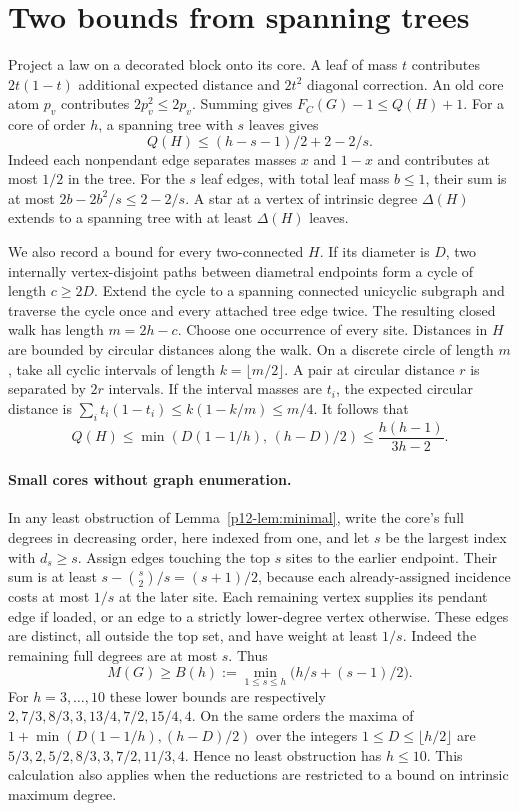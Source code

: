 \documentclass[11pt,a4paper]{article}
\begin{document}
\section{Two bounds from spanning trees}
Project a law on a decorated block onto its core. A leaf of mass $t$ contributes $2t(1-t)$ additional expected distance and $2t^2$ diagonal correction. An old core atom $p_v$ contributes $2p_v^2\le2p_v$. Summing gives $F_C(G)-1\le Q(H)+1$. For a core of order $h$, a spanning tree with $s$ leaves gives
\[
 Q(H)\le (h-s-1)/2+2-2/s.
\]
Indeed each nonpendant edge separates masses $x$ and $1-x$ and contributes at most $1/2$ in the tree. For the $s$ leaf edges, with total leaf mass $b\le1$, their sum is at most $2b-2b^2/s\le2-2/s$. A star at a vertex of intrinsic degree $\Delta(H)$ extends to a spanning tree with at least $\Delta(H)$ leaves.

We also record a bound for every two-connected $H$. If its diameter is $D$, two internally vertex-disjoint paths between diametral endpoints form a cycle of length $c\ge2D$. Extend the cycle to a spanning connected unicyclic subgraph and traverse the cycle once and every attached tree edge twice. The resulting closed walk has length $m=2h-c$. Choose one occurrence of every site. Distances in $H$ are bounded by circular distances along the walk. On a discrete circle of length $m$, take all cyclic intervals of length $k=\lfloor m/2\rfloor$. A pair at circular distance $r$ is separated by $2r$ intervals. If the interval masses are $t_i$, the expected circular distance is $\sum_i t_i(1-t_i)\le k(1-k/m)\le m/4$. It follows that
\[
 Q(H)\le\min\left(D(1-1/h),\,(h-D)/2\right)
 \le\frac{h(h-1)}{3h-2}.
\]

\paragraph{Small cores without graph enumeration.}
In any least obstruction of Lemma~\ref{p12-lem:minimal}, write the core's full degrees in decreasing order, here indexed from one, and let $s$ be the largest index with $d_s\ge s$. Assign edges touching the top $s$ sites to the earlier endpoint. Their sum is at least $s-\binom{s}{2}/s=(s+1)/2$, because each already-assigned incidence costs at most $1/s$ at the later site. Each remaining vertex supplies its pendant edge if loaded, or an edge to a strictly lower-degree vertex otherwise. These edges are distinct, all outside the top set, and have weight at least $1/s$. Indeed the remaining full degrees are at most $s$. Thus
\[
 M(G)\ge B(h):=\min_{1\le s\le h}\bigl(h/s+(s-1)/2\bigr).
\]
For $h=3,\dots,10$ these lower bounds are respectively
$2,7/3,8/3,3,13/4,7/2,15/4,4$.
On the same orders the maxima of $1+\min(D(1-1/h),(h-D)/2)$ over the integers $1\le D\le\lfloor h/2\rfloor$ are
$5/3,2,5/2,8/3,3,7/2,11/3,4$.
Hence no least obstruction has $h\le10$. This calculation also applies when the reductions are restricted to a bound on intrinsic maximum degree.
\end{document}
